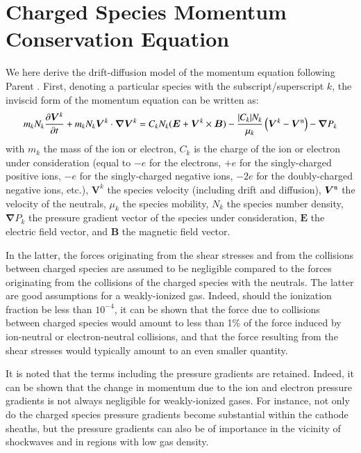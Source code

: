 \documentclass{warpdoc}
\renewcommand{\vec}[1]{\bm{#1}}
\begin{document}
\section{Charged Species Momentum Conservation Equation}


We here derive the drift-diffusion model of the momentum equation following Parent \cite{jcp:2011:parent}.  First, denoting a particular species with the subscript/superscript $k$, the inviscid form of the momentum equation can be written as:
%
\begin{equation}
  m_{k} N_k \frac{{\partial} \vec{V}^k}{\partial t} 
  +m_{k} N_k \vec{V}^k \cdot \vec{\nabla} \vec{V}^k 
  =
  C_k N_k (\vec{E}+\vec{V}^k\times \vec{B})-\frac{|C_k|N_k}{\mu_k} \left( \vec{V}^k -\vec{V}^{\rm n} \right) -\vec{\nabla} P_k
\end{equation}
%
with $m_k$ the mass of the ion or electron, $C_k$ is the charge of the ion or electron under consideration (equal to $-e$ for the electrons, $+e$ for the singly-charged positive ions, $-e$ for the singly-charged negative ions, $-2e$ for the doubly-charged negative ions, etc.), $\vec{V}^k$ the species velocity (including drift and diffusion), $\vec{V}^{\rm n}$ the velocity of the neutrals, $\mu_k$ the species mobility, $N_k$ the species number density, $\vec{\nabla} P_k$ the pressure gradient vector of the species under consideration,  $\vec{E}$  the electric field vector, and $\vec{B}$ the magnetic field vector. 


In the latter, the forces originating from the shear stresses and from the collisions between charged species are assumed to be negligible compared to the forces originating from the collisions of the charged species with the neutrals. The latter are good assumptions for a weakly-ionized gas. Indeed, should the ionization fraction be less than $10^{-4}$, it can be shown that the force due to collisions between charged species would amount to less than 1\% of the force induced by ion-neutral or electron-neutral collisions, and that the force resulting from the shear stresses would typically amount to an even smaller quantity.


It is noted that the terms including the pressure gradients are retained. Indeed, it can  be shown that the change in momentum due to the ion and electron pressure gradients is not always negligible for weakly-ionized gases. For instance, not only do the charged species pressure gradients become substantial within the cathode sheaths, but the pressure gradients can also be of importance in the vicinity of shockwaves and in regions with low gas density. 
\end{document}
